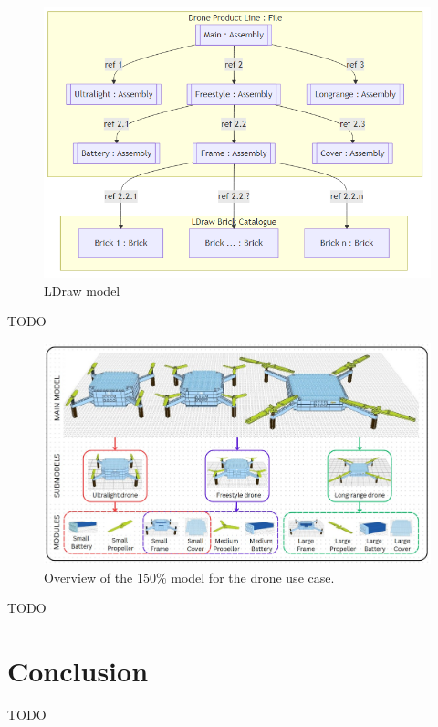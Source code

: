 \documentclass[sigconf,review]{acmart}
\begin{document}
\begin{figure}[htbp]
    \includegraphics[width=\columnwidth]{./ldraw-model.png}
    \caption{LDraw model}
    \label{fig:ldraw-model}
\end{figure}

TODO

\begin{figure}[htbp]
    \includegraphics[width=\textwidth]{./150_MODEL_3.jpg}
    \caption{Overview of the 150\% model for the drone use case.}
    \label{fig:150-model}
\end{figure}

TODO

\section{Conclusion}
\label{sec:conclusion}

TODO



\end{document}
